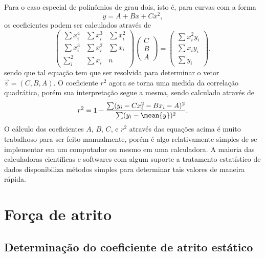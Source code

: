 Para o caso especial de polinômios de grau dois, isto é, para curvas com a forma
\begin{equation}
    y = A + B x + C x^2,
\end{equation}
%
os coeficientes podem ser calculados através de
\begin{equation}
\begin{pmatrix}
\sum x_i^4 & \sum x_i^3 & \sum x_i^2 \\ \sum x_i^3 & \sum x_i^2 & \sum x_i \\ \sum_i^2 & \sum x_i & n \end{pmatrix} \begin{pmatrix} C \\ B \\ A \end{pmatrix} = \begin{pmatrix} \sum x_i^2y_i \\ \sum x_iy_i \\ \sum y_i \end{pmatrix},
\end{equation}
%
sendo que tal equação tem que ser resolvida para determinar o vetor $\vec{v} = (C, B, A)$. O coeficiente $r^2$ agora se torna uma medida da correlação quadrática, porém sua interpretação segue a mesma, sendo calculado através de
\begin{equation}
    r^2 = 1 - \frac{\sum (y_i - C x_i^2 - B x_i - A)^2}{\sum (y_i - \mean{y})^2}.
\end{equation}
%
O cálculo dos coeficientes $A$, $B$, $C$, e $r^2$ através das equações acima é muito trabalhoso para ser feito manualmente, porém é algo relativamente simples de se implementar em um computador ou mesmo em uma calculadora. A maioria das calculadoras científicas e softwares com algum suporte a tratamento estatístico de dados disponibiliza métodos simples para determinar tais valores de maneira rápida.

\section{Força de atrito}

\subsection{Determinação do coeficiente de atrito estático}

